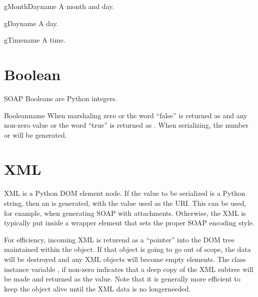 \begin{classdesc}{gMonthDay}{name}
A month and day.
\end{classdesc}

\begin{classdesc}{gDay}{name}
A day.
\end{classdesc}

\begin{classdesc}{gTime}{name}
A time.
\end{classdesc}

\section{Boolean}

SOAP Booleans are Python integers.

\begin{classdesc}{Boolean}{name}
When marshaling zero or the word ``false'' is returned as 
and any non-zero value or the word ``true'' is returned as .
When serializing, the number  or  will be generated.
\end{classdesc}

\section{XML}

XML is a Python DOM element node.
If the value to be serialized is a Python string, then an 
is generated, with the value used as the URI.
This can be used, for example, when generating SOAP with attachments.
Otherwise, the XML is typically put inside a wrapper element that sets
the proper SOAP encoding style.

For efficiency, incoming XML is returend as a ``pointer'' into the
DOM tree maintained within the  object.
If that object is going to go out of scope, the data will be destroyed
and any XML objects will become empty elements.
The class instance variable , if non-zero indicates that a
deep copy of the XML subtree will be made and returned as the value.
Note that it is generally more efficient to keep the 
object alive until the XML data is no longerneeded.


